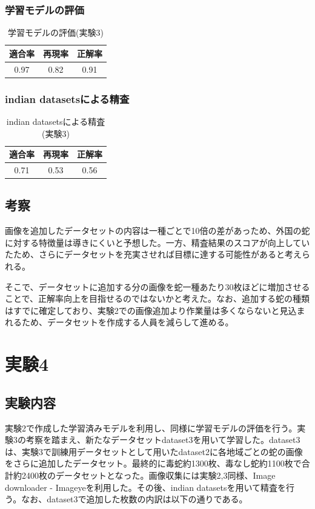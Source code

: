 \documentclass[a4paper, 11pt, titlepage]{jsarticle}
\begin{document}
\subsubsection{学習モデルの評価}
\begin{table}[htb]
\centering
  \caption{学習モデルの評価(実験3)}
  \begin{tabular}{|c|c|c|}  \hline
    適合率 & 再現率 & 正解率 \\ \hline
    0.97 & 0.82 & 0.91 \\ \hline
  \end{tabular}
\end{table}

\clearpage

\subsubsection{indian datasetsによる精査}
\begin{table}[htb]
\centering
  \caption{indian datasetsによる精査(実験3)}
  \begin{tabular}{|c|c|c|}  \hline
    適合率 & 再現率 & 正解率 \\ \hline
    0.71 & 0.53 & 0.56 \\ \hline
  \end{tabular}
\end{table}

\subsection{考察}
画像を追加したデータセットの内容は一種ごとで10倍の差があっため、外国の蛇に対する特徴量は導きにくいと予想した。一方、精査結果のスコアが向上していたため、さらにデータセットを充実させれば目標に達する可能性があると考えられる。\par
そこで、データセットに追加する分の画像を蛇一種あたり30枚ほどに増加させることで、正解率向上を目指せるのではないかと考えた。なお、追加する蛇の種類はすでに確定しており、実験2での画像追加より作業量は多くならないと見込まれるため、データセットを作成する人員を減らして進める。\par

\section{実験4}
\subsection{実験内容}
実験2で作成した学習済みモデルを利用し、同様に学習モデルの評価を行う。実験3の考察を踏まえ、新たなデータセットdataset3を用いて学習した。dataset3は、実験3で訓練用データセットとして用いたdataset2に各地域ごとの蛇の画像をさらに追加したデータセット。最終的に毒蛇約1300枚、毒なし蛇約1100枚で合計約2400枚のデータセットとなった。画像収集には実験2,3同様、Image downloader - Imageyeを利用した。その後、indian datasetsを用いて精査を行う。なお、dataset3で追加した枚数の内訳は以下の通りである。\par
\end{document}
